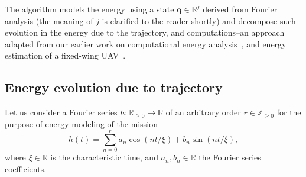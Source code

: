 \documentclass[letterpaper,10pt,conference]{ieeeconf}
\theoremstyle{definition}
\begin{document}
The algorithm models the energy using a state $\mathbf{q}\in\mathbb{R}^j$ derived from Fourier analysis (the meaning of $j$ is clarified to the reader shortly) and decompose such evolution in the energy due to the trajectory, and computations--an approach adapted from our earlier work on computational energy analysis~\cite{seewald2019coarse, seewald2019component}, and energy estimation of a fixed-wing UAV~\cite{seewald2020mechanical}. 

\subsection{Energy evolution due to trajectory}
\label{sec:energy-model}

Let us consider a Fourier series $h:\mathbb{R}_{\geq 0}\rightarrow\mathbb{R}$ of an arbitrary order $r\in\mathbb{Z}_{\geq 0}$ for the purpose of energy modeling of the mission
\begin{equation}\label{eq:fourier}
  h(t)=\sum_{n=0}^{r}{a_n\cos\left({nt/\xi}\right)+b_n\sin{\left({nt/\xi}\right)}},
\end{equation}
where $\xi\in\mathbb{R}$ is the characteristic time, and $a_n, b_n\in\mathbb{R}$ the Fourier series coefficients.
\end{document}
